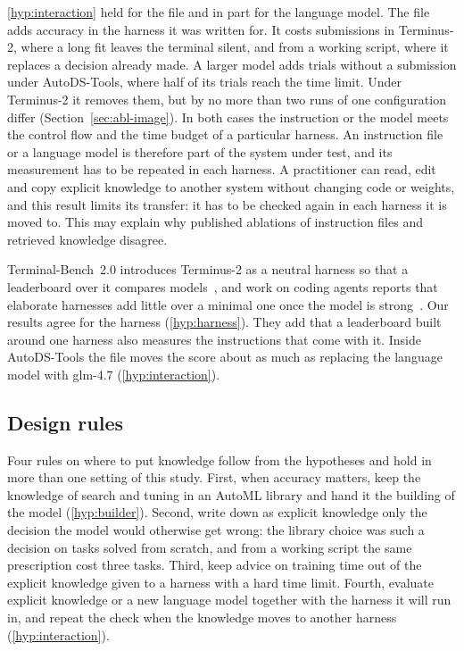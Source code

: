 \ref{hyp:interaction} held for the file and in part for the language model.
The file adds accuracy in the harness it was written for. It costs
submissions in Terminus-2, where a long fit leaves the terminal silent, and
from a working script, where it replaces a decision already made. A larger
model adds trials without a submission under AutoDS-Tools, where half of its
trials reach the time limit. Under Terminus-2 it removes them, but by no more
than two runs of one configuration differ (Section~\ref{sec:abl-image}). In both cases the
instruction or the model meets the control flow and the time budget of a
particular harness. An instruction file or a language model is therefore
part of the system under test, and its measurement has to be repeated in
each harness. A practitioner can read, edit and copy explicit knowledge to another
system without changing code or weights, and this result limits its transfer: it has to be
checked again in each harness it is moved to. This may explain why published ablations of instruction files
and retrieved knowledge disagree.

Terminal-Bench~2.0 introduces Terminus-2 as a neutral harness so that a
leaderboard over it compares models~\citep{merrill2026terminalbench}, and
work on coding agents reports that elaborate harnesses add little over a
minimal one once the model is
strong~\citep{brilliantov2026harness,hu2026beyondmodel}. Our results agree
for the harness (\ref{hyp:harness}). They add that a leaderboard built around
one harness also measures the instructions that come with it. Inside
AutoDS-Tools the file moves the score about as much as replacing the
language model with glm-4.7 (\ref{hyp:interaction}).

\subsection{Design rules}
\label{sec:rules}

Four rules on where to put knowledge follow from the hypotheses and hold
in more than one setting of this study. First, when accuracy matters, keep
the knowledge of search and tuning in an AutoML library and hand it the
building of the model (\ref{hyp:builder}). Second, write down as explicit
knowledge only the decision the model would otherwise get wrong: the library
choice was such a decision on tasks solved from scratch, and from a working
script the same prescription cost three tasks. Third, keep advice on
training time out of the explicit knowledge given to a harness with a hard
time limit. Fourth, evaluate explicit knowledge or a new language model
together with the harness it will run in, and repeat the check when the
knowledge moves to another harness (\ref{hyp:interaction}).

